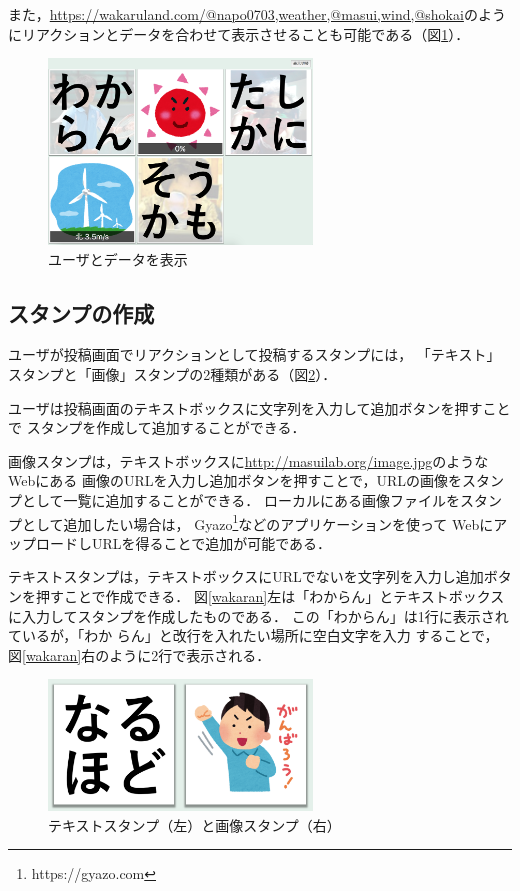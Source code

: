 また，\url{https://wakaruland.com/@napo0703,weather,@masui,wind,@shokai}のようにリアクションとデータを合わせて表示させることも可能である（図\ref{n_w_m_w_s}）．

\begin{figure}[h]
\centering
\includegraphics[width=7cm]{images/n_w_m_w_s.png}
\caption{ユーザとデータを表示}
\label{n_w_m_w_s}
\end{figure}

\subsection{スタンプの作成}
ユーザが投稿画面でリアクションとして投稿するスタンプには，
「テキスト」スタンプと「画像」スタンプの2種類がある（図\ref{stamp}）．

ユーザは投稿画面のテキストボックスに文字列を入力して追加ボタンを押すことで
スタンプを作成して追加することができる．

画像スタンプは，テキストボックスに\url{http://masuilab.org/image.jpg}のようなWebにある
画像のURLを入力し追加ボタンを押すことで，URLの画像をスタンプとして一覧に追加することができる．
ローカルにある画像ファイルをスタンプとして追加したい場合は，
Gyazo\footnote{https://gyazo.com}などのアプリケーションを使って
WebにアップロードしURLを得ることで追加が可能である．

テキストスタンプは，テキストボックスにURLでないを文字列を入力し追加ボタンを押すことで作成できる．
図\ref{wakaran}左は「わからん」とテキストボックスに入力してスタンプを作成したものである．
この「わからん」は1行に表示されているが，「わか らん」と改行を入れたい場所に空白文字を入力
することで，図\ref{wakaran}右のように2行で表示される．


\begin{figure}[h]
\centering
\includegraphics[width=7cm]{images/stamp.png}
\caption{テキストスタンプ（左）と画像スタンプ（右）}
\label{stamp}
\end{figure}

